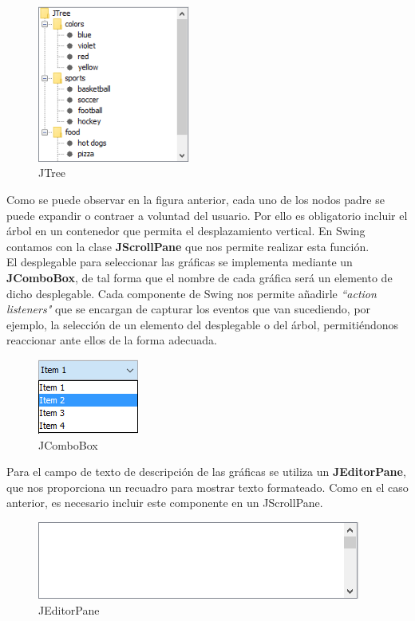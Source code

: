 \documentclass[12pt, a4paper]{book}
\begin{document}
\begin{figure}[htbp]
	\centering
	\includegraphics[width=5cm]{figuras/JTree.PNG}
	\caption{JTree}
	\label{fig:JTree}
	\end {figure}

Como se puede observar en la figura anterior, cada uno de los nodos padre se puede expandir o contraer a voluntad del usuario. Por ello es obligatorio incluir el árbol en un contenedor que permita el desplazamiento vertical. En Swing contamos con la clase \textbf{JScrollPane} que nos permite realizar esta función.
\\

El desplegable para seleccionar las gráficas se implementa mediante un \textbf{JComboBox}, de tal forma que el nombre de cada gráfica será un elemento de dicho desplegable. Cada componente de Swing nos permite añadirle \textit{``action listeners"} que se encargan de capturar los eventos que van sucediendo, por ejemplo, la selección de un elemento del desplegable o del árbol, permitiéndonos reaccionar ante ellos de la forma adecuada.

\begin{figure}[htbp]
	\centering
	\includegraphics{figuras/JComboBox.png}
	\caption{JComboBox}
	\label{fig:JComboBox}
	\end {figure}

Para el campo de texto de descripción de las gráficas se utiliza un \textbf{JEditorPane}, que nos proporciona un recuadro para mostrar texto formateado. Como en el caso anterior, es necesario incluir este componente en un JScrollPane.

\begin{figure}[htbp]
	\centering
	\includegraphics{figuras/JEditorPane.png}
	\caption{JEditorPane}
	\label{fig:JEditorPane}
	\end {figure}
\newpage
\end{document}

